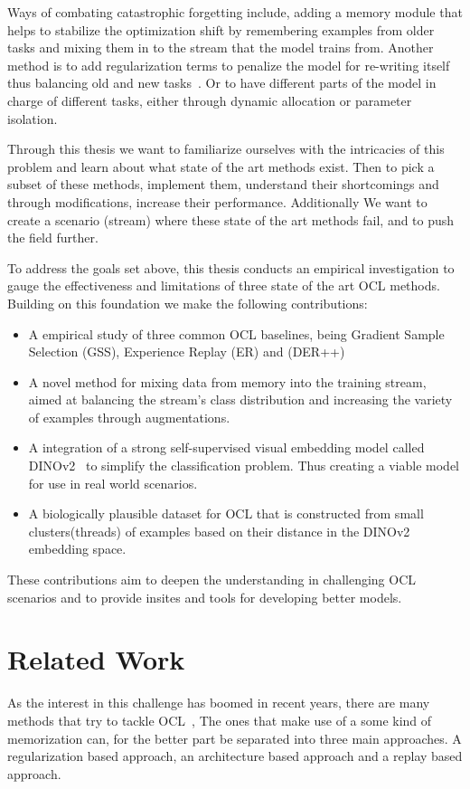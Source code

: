\documentclass[oneside]{ctuthesis}
\begin{document}
Ways of combating catastrophic forgetting include, adding a memory module that helps to stabilize the optimization shift by remembering examples from older tasks and mixing them in to the stream that the model trains from. Another method is to add regularization terms to penalize the model for re-writing itself thus balancing old and new tasks~\cite{clsurvey}. Or to have different parts of the model in charge of different tasks, either through dynamic allocation or parameter isolation.

Through this thesis we want to familiarize ourselves with the intricacies of this problem and learn about what state of the art methods exist. Then to pick a subset of these methods, implement them, understand their shortcomings and through modifications, increase their performance. Additionally We want to create a scenario (stream) where these state of the art methods fail, and to push the field further.

To address the goals set above, this thesis conducts an empirical investigation to gauge the effectiveness and limitations of three state of the art OCL methods. Building on this foundation we make the following contributions:
\begin{itemize}
    \item A empirical study of three common OCL baselines, being Gradient Sample Selection (GSS), Experience Replay (ER) and (DER++)
    \item A novel method for mixing data from memory into the training stream, aimed at balancing the stream's class distribution and increasing the variety of examples through augmentations.
    \item A integration of a strong self-supervised visual embedding model called DINOv2~\cite{DINOv2} to simplify the classification problem. Thus creating a viable model for use in real world scenarios.
    \item A biologically plausible dataset for OCL that is constructed from small clusters(threads) of examples based on their distance in the DINOv2 embedding space.
\end{itemize}

These contributions aim to deepen the understanding in challenging OCL scenarios and to provide insites and tools for developing better models. 

\chapter{Related Work}
As the interest in this challenge has boomed in recent years, there are many methods that try to tackle OCL~\cite{oclsurvey_graphs}, The ones that make use of a some kind of memorization can, for the better part be separated into three main approaches. A regularization based approach, an architecture based approach and a replay based approach.
\end{document}
